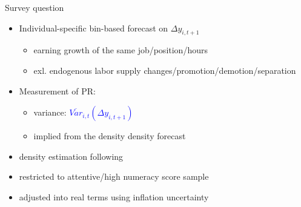 \documentclass{beamer}
\begin{document}
\begin{frame}{Survey question}
	\begin{itemize}
		\item Individual-specific bin-based forecast on $\Delta y_{i,t+1}$
		\begin{itemize}
			\item earning growth of the same job/position/hours
				\item exl. endogenous labor supply changes/promotion/demotion/separation 
		\end{itemize} 
		\item  Measurement of PR: 
		\begin{itemize}
			\item variance: \textcolor{blue}{$\overline {Var}_{i,t}(\Delta y_{i,t+1})$}  
			\item implied from the density density forecast
		\end{itemize}
\item density estimation following \cite{engelberg_comparing_2009}			
\item restricted to attentive/high numeracy score sample
\item adjusted into real terms using inflation uncertainty 
\end{itemize}
\end{frame}
\end{document}
